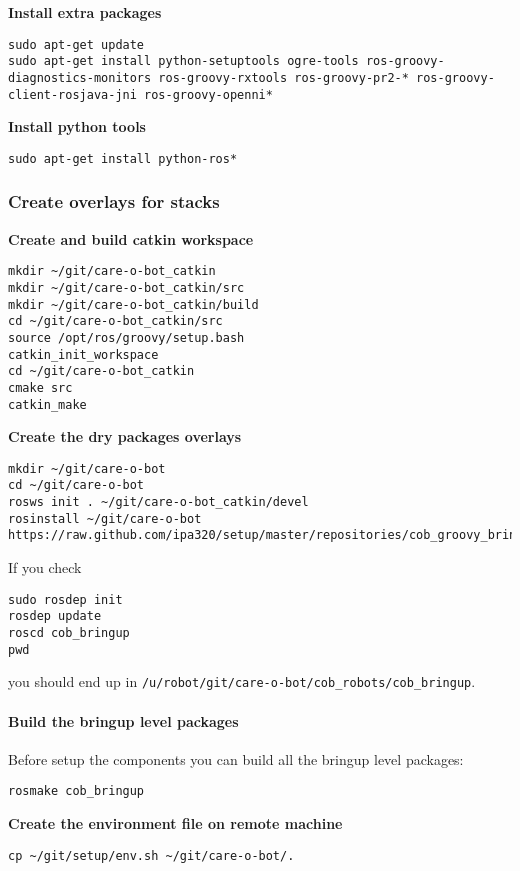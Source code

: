 \textbf{Install extra packages}
\begin{lstlisting}
sudo apt-get update
sudo apt-get install python-setuptools ogre-tools ros-groovy-diagnostics-monitors ros-groovy-rxtools ros-groovy-pr2-* ros-groovy-client-rosjava-jni ros-groovy-openni*
\end{lstlisting}

\textbf{Install python tools}
\begin{lstlisting}
sudo apt-get install python-ros*
\end{lstlisting}

\subsubsection{Create overlays for stacks}
\textbf{Create and build  catkin workspace}
\begin{lstlisting}
mkdir ~/git/care-o-bot_catkin
mkdir ~/git/care-o-bot_catkin/src
mkdir ~/git/care-o-bot_catkin/build
cd ~/git/care-o-bot_catkin/src
source /opt/ros/groovy/setup.bash
catkin_init_workspace
cd ~/git/care-o-bot_catkin
cmake src
catkin_make
\end{lstlisting}

\textbf{Create the dry packages overlays}
\begin{lstlisting}
mkdir ~/git/care-o-bot
cd ~/git/care-o-bot
rosws init . ~/git/care-o-bot_catkin/devel
rosinstall ~/git/care-o-bot https://raw.github.com/ipa320/setup/master/repositories/cob_groovy_bringup.rosinstall
\end{lstlisting}

If you check 
\begin{lstlisting}
sudo rosdep init
rosdep update
roscd cob_bringup
pwd
\end{lstlisting}
you should end up in \texttt{/u/robot/git/care-o-bot/cob\_robots/cob\_bringup}.

\paragraph{Build the bringup level packages}
Before setup the components you can build all the bringup level packages:
\begin{lstlisting}
rosmake cob_bringup
\end{lstlisting}

\textbf{Create the environment file on remote machine}
\begin{lstlisting}
cp ~/git/setup/env.sh ~/git/care-o-bot/.
\end{lstlisting}

